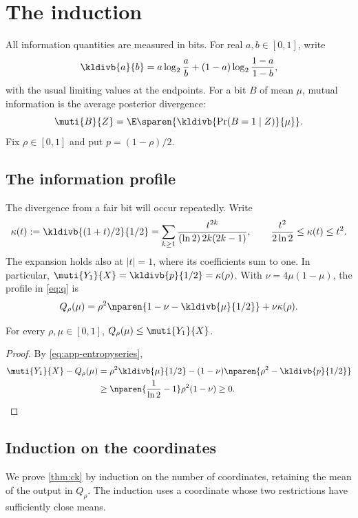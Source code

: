 \section{The induction}\label{sec:induction}
All information quantities are measured in bits. For real $a,b\in[0,1]$,
write
\[
 \kldivb{a}{b}
 =a\log_2\frac ab+(1-a)\log_2\frac{1-a}{1-b},
\]
with the usual limiting values at the endpoints. For a bit $B$ of mean
$\mu$, mutual information is the average posterior divergence:
\begin{equation}\label{eq:posterior-divergence}
 \muti{B}{Z}=\E\sparen{\kldivb{\Pr(B=1\mid Z)}{\mu}}.
\end{equation}
Fix $\rho\in[0,1]$ and put $p=(1-\rho)/2$.

\subsection{The information profile}\label{sec:proof}
The divergence from a fair bit will occur repeatedly. Write
\begin{equation}\label{eq:app-entropyseries}
 \kappa(t):=\kldivb{(1+t)/2}{1/2}
 =\sum_{k\ge1}\frac{t^{2k}}{(\ln2)\,2k(2k-1)},
 \qquad \frac{t^2}{2\ln2}\le\kappa(t)\le t^2.
\end{equation}
The expansion holds also at $|t|=1$, where its coefficients sum to one.
In particular, $\muti{Y_1}{X}=\kldivb{p}{1/2}=\kappa(\rho)$.
With $\nu=4\mu(1-\mu)$, the profile in \eqref{eq:q} is
\begin{equation}\label{eq:q-divergence}
 Q_\rho(\mu)=\rho^2\nparen{1-\nu-\kldivb{\mu}{1/2}}
 +\nu\kappa(\rho).
\end{equation}

\begin{lemma}\label{lem:q}
For every $\rho,\mu\in[0,1]$,
$Q_\rho(\mu)\le\muti{Y_1}{X}$.
\end{lemma}
\begin{proof}
By \eqref{eq:app-entropyseries},
\begin{align*}
 \muti{Y_1}{X}-Q_\rho(\mu)
 &=\rho^2\kldivb{\mu}{1/2}
   -(1-\nu)\nparen{\rho^2-\kldivb{p}{1/2}}\\
 &\ge\nparen{\frac1{\ln2}-1}\rho^2(1-\nu)\ge0.
\end{align*}
\end{proof}

\subsection{Induction on the coordinates}
We prove \autoref{thm:ck} by induction on the number of coordinates,
retaining the mean of the output in $Q_\rho$. The induction uses a
coordinate whose two restrictions have sufficiently close means.

